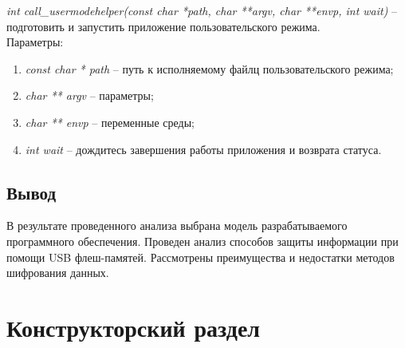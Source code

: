 \documentclass[a4paper, 10pt]{article}
\begin{document}
	\textit{int call\_usermodehelper(const char *path, char **argv, char **envp, int wait)} -- подготовить и запустить приложение пользовательского режима.
	\\ Параметры:
	\begin{enumerate}
		\item \textit{const char * path} -- путь к исполняемому файлц пользовательского режима;
		\item \textit{char ** argv} -- параметры;
		\item \textit{char ** envp} --  переменные среды;
		\item \textit{int wait}  -- дождитесь завершения работы приложения и возврата статуса.
	\end{enumerate}
	\subsection{Вывод}
	В результате проведенного анализа выбрана модель разрабатываемого программного обеспечения. Проведен анализ способов защиты информации при помощи USB флеш-памятей. Рассмотрены преимущества и недостатки методов шифрования данных.
\clearpage
\newpage
\section{Конструкторский раздел}
\end{document}
